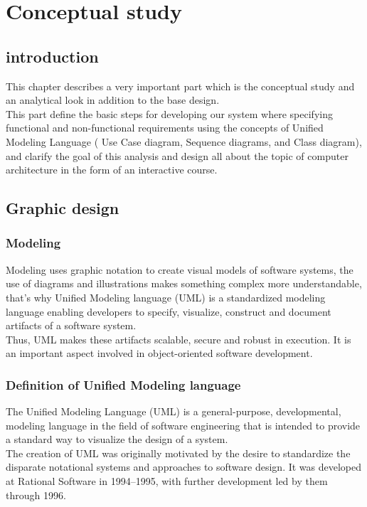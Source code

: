 \chapter{Conceptual study}

\section{introduction}
This chapter describes a very important part which is the conceptual study and an analytical look in addition to the base design.\\
This part define the basic steps for developing our system where specifying functional and non-functional requirements using the concepts of Unified Modeling Language ( Use Case diagram, Sequence diagrams, and Class diagram), and clarify the goal of
this analysis and design all about the topic of computer architecture in the form of an interactive course.

\section{Graphic design }

\subsection{Modeling}
Modeling uses graphic notation to create visual models of software systems, the use of diagrams and illustrations makes something
complex more understandable, that's why Unified Modeling language (UML) \cite{Techopedia-UML} is a standardized modeling language enabling developers to specify, visualize, construct and document artifacts of a software system.\\
Thus, UML makes these artifacts scalable, secure and robust in execution. It is an important aspect involved in object-oriented software development.

\subsection{Definition of Unified Modeling language}
The Unified Modeling Language (UML) is a general-purpose, developmental, modeling language in the field of software engineering that is intended to provide a standard way to visualize the design of a system.\cite{YThi-UML}\\

The creation of UML was originally motivated by the desire to standardize the disparate notational systems and approaches to software design. It was developed at Rational Software in 1994–1995, with further development led by them through 1996.\cite{YThi-UML}\\

